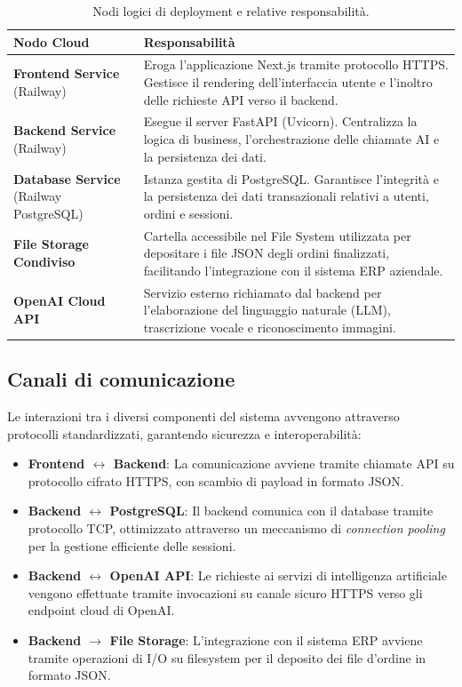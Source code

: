 \documentclass[a4paper, 11pt, oneside]{scrartcl}
\begin{document}
\begin{table}[H]
    \centering
    \renewcommand{\arraystretch}{1.5}
    \begin{tabularx}{\textwidth}{@{}lX@{}}
        \toprule
        \textbf{Nodo Cloud} & \textbf{Responsabilità} \\
        \midrule
        \textbf{Frontend Service} (Railway) & Eroga l'applicazione Next.js tramite protocollo HTTPS. Gestisce il rendering dell'interfaccia utente
      e l'inoltro delle richieste API verso il backend. \\
        \textbf{Backend Service} (Railway) & Esegue il server FastAPI (Uvicorn). Centralizza la logica di business, l'orchestrazione delle chiamate
      AI e la persistenza dei dati. \\
        \textbf{Database Service} (Railway PostgreSQL) & Istanza gestita di PostgreSQL. Garantisce l'integrità e la persistenza dei dati
      transazionali relativi a utenti, ordini e sessioni. \\
        \textbf{File Storage Condiviso} & Cartella accessibile nel File System utilizzata per depositare i file JSON degli ordini finalizzati,
      facilitando l'integrazione con il sistema ERP aziendale. \\
        \textbf{OpenAI Cloud API} & Servizio esterno richiamato dal backend per l'elaborazione del linguaggio naturale (LLM), trascrizione vocale e
      riconoscimento immagini. \\
        \bottomrule
    \end{tabularx}
    \caption{Nodi logici di deployment e relative responsabilità.}
\end{table}

\subsection{Canali di comunicazione}
Le interazioni tra i diversi componenti del sistema avvengono attraverso protocolli standardizzati, garantendo sicurezza e interoperabilità:
\begin{itemize}
    \item \textbf{Frontend $\leftrightarrow$ Backend}: La comunicazione avviene tramite chiamate API su protocollo cifrato HTTPS, con scambio
      di payload in formato JSON.
    \item \textbf{Backend $\leftrightarrow$ PostgreSQL}: Il backend comunica con il database tramite protocollo TCP, ottimizzato attraverso un
      meccanismo di \textit{connection pooling} per la gestione efficiente delle sessioni.
    \item \textbf{Backend $\leftrightarrow$ OpenAI API}: Le richieste ai servizi di intelligenza artificiale vengono effettuate tramite invocazioni
       su canale sicuro HTTPS verso gli endpoint cloud di OpenAI.
    \item \textbf{Backend $\rightarrow$ File Storage}: L'integrazione con il sistema ERP avviene tramite operazioni di I/O su filesystem per il
      deposito dei file d'ordine in formato JSON.
\end{itemize}
\end{document}
